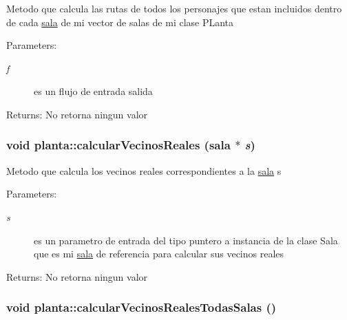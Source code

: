 Metodo que calcula las rutas de todos los personajes que estan incluidos dentro de cada \hyperlink{classsala}{sala} de mi vector de salas de mi clase PLanta \begin{Desc}
\item[Parameters:]
\begin{description}
\item[{\em f}]es un flujo de entrada salida \end{description}
\end{Desc}
\begin{Desc}
\item[Returns:]No retorna ningun valor \end{Desc}
\hypertarget{classplanta_afb5b4511eeaa66b208cb6ec08c60a9e}{
\subsubsection[calcularVecinosReales]{\setlength{\rightskip}{0pt plus 5cm}void planta::calcularVecinosReales ({\bf sala} $\ast$ {\em s})}}
\label{classplanta_afb5b4511eeaa66b208cb6ec08c60a9e}


Metodo que calcula los vecinos reales correspondientes a la \hyperlink{classsala}{sala} s \begin{Desc}
\item[Parameters:]
\begin{description}
\item[{\em s}]es un parametro de entrada del tipo puntero a instancia de la clase Sala que es mi \hyperlink{classsala}{sala} de referencia para calcular sus vecinos reales \end{description}
\end{Desc}
\begin{Desc}
\item[Returns:]No retorna ningun valor \end{Desc}
\hypertarget{classplanta_40af5c175ab9b779d8aceebc0c4361c2}{
\subsubsection[calcularVecinosRealesTodasSalas]{\setlength{\rightskip}{0pt plus 5cm}void planta::calcularVecinosRealesTodasSalas ()}}
\label{classplanta_40af5c175ab9b779d8aceebc0c4361c2}


